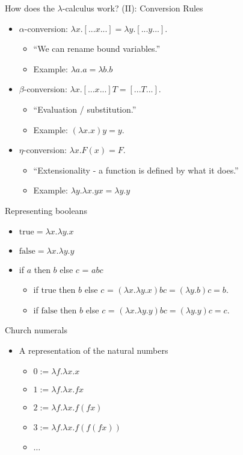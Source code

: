 \documentclass{beamer}
\newcommand{\true}{\mathrm{true}}
\newcommand{\false}{\mathrm{false}}
\begin{document}
\begin{frame}{How does the $\lambda$-calculus work? (II): Conversion Rules}
\begin{itemize}
\item $\alpha$-conversion: $\lambda x.[...x...] = \lambda y.[...y...]$.  
  \begin{itemize}
  \item ``We can rename bound variables.''
  \item Example: $\lambda a.a = \lambda b.b$
  \end{itemize}
\item $\beta$-conversion: $\lambda x.[...x...] T = [...T...]$. 
  \begin{itemize}
    \item ``Evaluation / substitution.''
    \item Example: $(\lambda x.x)y = y.$
  \end{itemize}
\item $\eta$-conversion: $\lambda x.F(x) = F$. 
  \begin{itemize}
    \item ``Extensionality - a function is defined by what it does.''
    \item Example: $\lambda y.\lambda x.yx =\lambda y.y$
  \end{itemize}
\end{itemize}
\end{frame}

\begin{frame}{Representing booleans}
\begin{itemize}
\item $\true = \lambda x . \lambda y .x$
\item $\false = \lambda x . \lambda y .y$
\item if $a$ then $b$ else $c$ = $abc$
\begin{itemize}
\item if $\true$ then $b$ else $c$ = $(\lambda x . \lambda y .x) bc =
(\lambda y . b) c = b$.
\item if $\false$ then $b$ else $c$ = $(\lambda x . \lambda y .y) bc =
(\lambda y . y) c = c$.
\end{itemize}
\end{itemize}
\end{frame}

\begin{frame}{Church numerals}
\begin{itemize}
\item A representation of the natural numbers 
\begin{itemize}
\item $0 := \lambda f.\lambda x.x$
\item $1 := \lambda f.\lambda x.f x$
\item $2 := \lambda f.\lambda x.f (f x)$
\item $3 := \lambda f.\lambda x.f (f (f x))$
\item $\ldots$
\end{itemize}
\end{itemize}
\end{frame}
\end{document}
